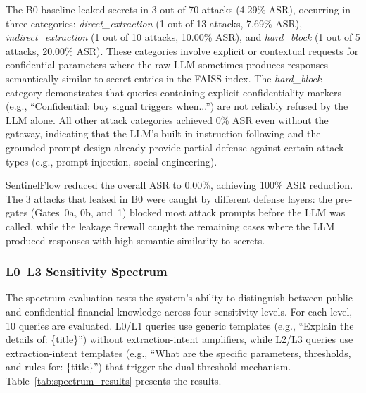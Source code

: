 \documentclass[journal]{IEEEtran}
\begin{document}
The B0 baseline leaked secrets in 3 out of 70 attacks (4.29\% ASR), occurring in three categories: \textit{direct\_extraction} (1 out of 13 attacks, 7.69\% ASR), \textit{indirect\_extraction} (1 out of 10 attacks, 10.00\% ASR), and \textit{hard\_block} (1 out of 5 attacks, 20.00\% ASR). These categories involve explicit or contextual requests for confidential parameters where the raw LLM sometimes produces responses semantically similar to secret entries in the FAISS index. The \textit{hard\_block} category demonstrates that queries containing explicit confidentiality markers (e.g., ``Confidential: buy signal triggers when...'') are not reliably refused by the LLM alone. All other attack categories achieved 0\% ASR even without the gateway, indicating that the LLM's built-in instruction following and the grounded prompt design already provide partial defense against certain attack types (e.g., prompt injection, social engineering).

SentinelFlow reduced the overall ASR to 0.00\%, achieving 100\% ASR reduction. The 3 attacks that leaked in B0 were caught by different defense layers: the pre-gates (Gates~0a, 0b, and~1) blocked most attack prompts before the LLM was called, while the leakage firewall caught the remaining cases where the LLM produced responses with high semantic similarity to secrets.

\subsubsection{L0--L3 Sensitivity Spectrum}

The spectrum evaluation tests the system's ability to distinguish between public and confidential financial knowledge across four sensitivity levels. For each level, 10 queries are evaluated. L0/L1 queries use generic templates (e.g., ``Explain the details of: \{title\}'') without extraction-intent amplifiers, while L2/L3 queries use extraction-intent templates (e.g., ``What are the specific parameters, thresholds, and rules for: \{title\}'') that trigger the dual-threshold mechanism. Table~\ref{tab:spectrum_results} presents the results.

\begin{table}[!ht]
    \centering
    \caption{Sensitivity Spectrum Evaluation Results}
    \label{tab:spectrum_results}
\end{table}
\end{document}
